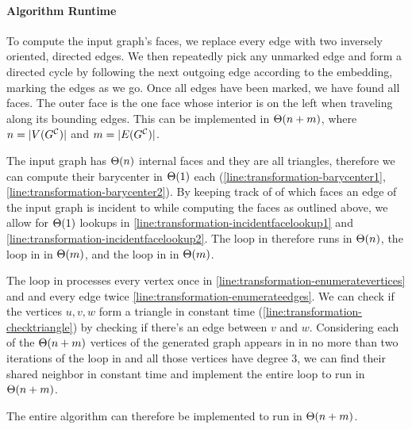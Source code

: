 \paragraph{Algorithm Runtime}

To compute the input graph's faces, we replace every edge with two inversely oriented, directed edges.
We then repeatedly pick any unmarked edge and form a directed cycle by following the next outgoing edge according to the embedding, marking the edges as we go.
Once all edges have been marked, we have found all faces.
The outer face is the one face whose interior is on the left when traveling along its bounding edges.
This can be implemented in $\Theta(n+m)$, where $n = \lvert V(G^\mathcal{C}_{}) \rvert$ and $m = \lvert E(G^\mathcal{C}_{}) \rvert$.

The input graph has $\Theta(n)$ internal faces and they are all triangles, therefore we can compute their barycenter in $\Theta(1)$ each (\cref{line:transformation-barycenter1}, \cref{line:transformation-barycenter2}).
By keeping track of of which faces an edge of the input graph is incident to while computing the faces as outlined above, we allow for $\Theta(1)$ lookups in \cref{line:transformation-incidentfacelookup1} and \cref{line:transformation-incidentfacelookup2}.
The loop in  therefore runs in $\Theta(n)$, the loop in  in $\Theta(m)$, and the loop in  in $\Theta(m)$.

The loop in  processes every vertex once in \cref{line:transformation-enumeratevertices} and and every edge twice \cref{line:transformation-enumerateedges}.
We can check if the vertices $u,v,w$ form a triangle in constant time (\cref{line:transformation-checktriangle}) by checking if there's an edge between $v$ and $w$.
Considering each of the $\Theta(n+m)$ vertices of the generated graph appears in  in no more than two iterations of the loop in  and all those vertices have degree 3, we can find their shared neighbor in constant time and implement the entire loop to run in $\Theta(n+m)$.

The entire algorithm can therefore be implemented to run in $\Theta(n+m)$.



